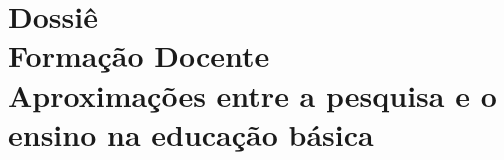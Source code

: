 

\mainmatter

\part[Dossiê: Formação docente: \itshape{aproximações entre a pesquisa e o ensino na educação básica}]{{\normalsize Dossiê}\\
Formação Docente\\
\textup{Aproximações entre a pesquisa e o ensino na educação básica}
}

















% 
% 
% 
% 


% 


% 

\backmatter





